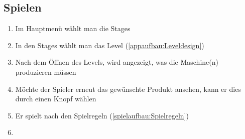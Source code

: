 \documentclass{scrartcl}
\begin{document}
\subsection{Spielen} 
	\begin{enumerate}
		\item Im Hauptmenü wählt man die Stages
		\item In den Stages wählt man das Level (\ref{appaufbau:Leveldesign})
		\item Nach dem Öffnen des Levels, wird angezeigt, was die Maschine(n) produzieren müssen
		\item Möchte der Spieler erneut das gewünschte Produkt ansehen, kann er dies durch einen Knopf wählen
		\item Er spielt nach den Spielregeln (\ref{spielaufbau:Spielregeln})
		\item 
	\end{enumerate}
\end{document}
